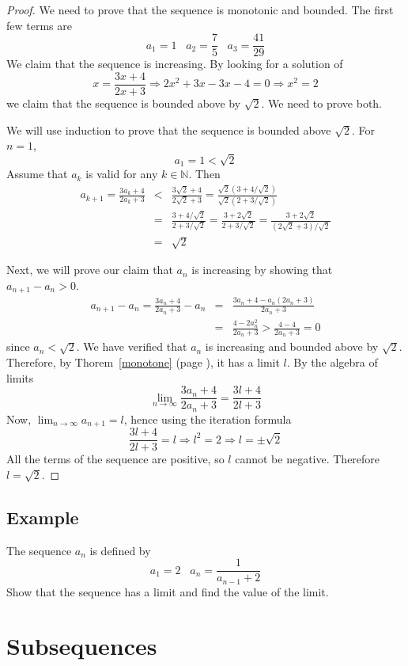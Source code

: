 \documentclass[12pt]{scrbook}
\begin{document}
\begin{proof}
We need to prove that the sequence is monotonic and bounded.  The first few terms are
\[ a_1 = 1 \;\;\; a_2 = \frac{7}{5} \;\;\; a_3 = \frac{41}{29} \]
We claim that the sequence is increasing.  By looking for a solution of
\[ x = \frac{3x + 4}{2x+3} \Rightarrow 2x^2 + 3x - 3x -4 = 0 \Rightarrow x^2 = 2 \]
we claim that the sequence is bounded above by $\sqrt{2}$.  We need to prove both.

We will use induction to prove that the sequence is bounded above $\sqrt{2}$.  For $n = 1$,
\[ a_1 = 1 < \sqrt{2} \]
Assume that $a_k$ is valid for any $k \in \mathbb{N}$.  Then
\begin{eqnarray*}
a_{k+1} = \frac{3a_k + 4}{2a_k + 3} &<& \frac{3\sqrt{2} + 4}{2\sqrt{2}+3} = \frac{\sqrt{2}(3 + 4/\sqrt{2})}{\sqrt{2}(2 + 3/\sqrt{2})} \\
&=& \frac{3 + 4/\sqrt{2}}{2 + 3/\sqrt{2}} = \frac{3 + 2\sqrt{2}}{2 + 3/\sqrt{2}} = \frac{3 + 2\sqrt{2}}{ (2\sqrt{2} + 3)/\sqrt{2}} \\
&=& \sqrt{2} 
\end{eqnarray*}

Next, we will prove our claim that $a_n$ is increasing by showing that $a_{n+1} - a_n > 0$.
\begin{eqnarray*}
a_{n+1} - a_n = \frac{3a_n + 4}{2a_n + 3} - a_n &=& \frac{3a_n + 4 - a_n(2a_n + 3)}{2a_n + 3} \\
&=& \frac{4 - 2a_n^2}{2a_n + 3} > \frac{4 - 4}{2a_n + 3} = 0 
\end{eqnarray*}
since $a_n < \sqrt{2}$.  We have verified that $a_n$ is increasing and bounded above by $\sqrt{2}$.  Therefore, by 
Thorem~\ref{monotone} (page \pageref{monotone}), it has a limit $l$.  By the algebra of limits
\[ \lim_{n \to \infty} \frac{3a_n + 4}{2a_n + 3} = \frac{3l + 4}{2l + 3} \]
Now, $\lim_{n \to \infty} a_{n+1} = l$, hence using the iteration formula
\[ \frac{3l + 4}{2l + 3} = l \Rightarrow l^2 = 2 \Rightarrow l = \pm\sqrt{2} \]
All the terms of the sequence are positive, so $l$ cannot be negative.  Therefore $l = \sqrt{2}$.
\end{proof}

\subsection{Example}
The sequence $a_n$ is defined by 
\[ a_1 = 2 \;\;\; a_n = \frac{1}{a_{n-1} + 2} \]
Show that the sequence has a limit and find the value of the limit.

\section{Subsequences}
\end{document}
